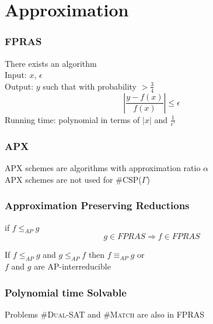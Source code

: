 \documentclass[a4paper,handout]{beamer}
\newcommand{\pname}[1]{\textsc{#1}}
\newcommand{\ccsp}{\#CSP}
\newcommand{\aple}{\le_{AP}}
\newcommand{\apeq}{\equiv_{AP}}
\newcommand{\oneoepsp}{\frac{1}{\epsilon'}}
\newcommand{\eps}{\epsilon}
\theoremstyle{definition}
\begin{document}
\section{Approximation}

\begin{frame}
\frametitle{FPRAS}
\begin{definition} 
There exists an algorithm \\
Input: \(x\), \(\eps\) \\
Output: \(y\) such that with probability \( > \frac{3}{4}\)
\[\left|\frac{y-f(x)}{f(x)}\right| \le \eps\]
Running time: polynomial in terms of \(|x|\) and \(\oneoepsp\)
\end{definition}
\end{frame}

\begin{frame}
\frametitle{APX}
APX schemes are algorithms with approximation ratio \(\alpha\) \\

\pause
APX schemes are not used for \ccsp(\(\Gamma\))
\end{frame}

\begin{frame}
\frametitle{Approximation Preserving Reductions}
\begin{definition}[AP-reduction]
if \(f \aple g\) \\
\[g \in FPRAS \Rightarrow f \in FPRAS\]
\end{definition}

\pause
If \(f \aple g\) and \(g \aple f\) then \(f \apeq g\) or \\
\(f\) and \(g\) are \textcolor{mygreen}{AP-interreducible}
\end{frame}

\begin{frame}
\frametitle{Polynomial time Solvable}

\pause
Problems \pname{\#Dual-SAT} and \pname{\#Match} are also in FPRAS
\end{frame}
\end{document}
